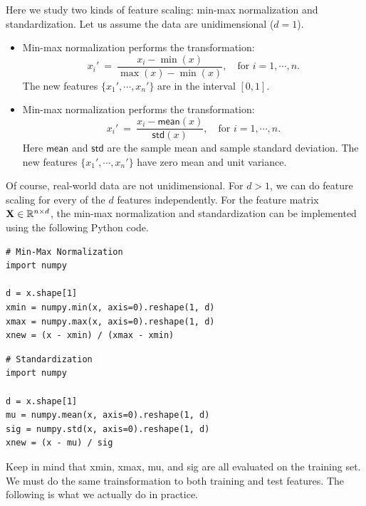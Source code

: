 \documentclass[11pt]{article}
\numberwithin{equation}{section}
\def\X{{\bf X}}
\def\RB{{\mathbb R}}
\def\mean{\mathsf{mean}}
\def\std{\mathsf{std}}
\begin{document}
Here we study two kinds of feature scaling: min-max normalization and standardization.
Let us assume the data are unidimensional ($d=1$).
\begin{itemize}
	\item 
	Min-max normalization performs the transformation:
	\begin{equation*}
	x_i' \: = \: \frac{ x_i - \min (x) }{ \max (x) - \min (x) },
	\quad \textrm{for } i = 1 , \cdots , n.
	\end{equation*}
	The new features $\{ x_1', \cdots , x_n' \}$ are in the interval $[0, 1]$.
	\item 
	Min-max normalization performs the transformation:
	\begin{equation*}
	x_i' \: = \: \frac{ x_i - \mean (x) }{ \std (x) },
	\quad \textrm{for } i = 1 , \cdots , n.
	\end{equation*}
	Here $\mean $ and $\std $ are the sample mean and sample standard deviation.
	The new features $\{ x_1', \cdots , x_n' \}$ have zero mean and unit variance.
\end{itemize}
Of course, real-world data are not unidimensional.
For $d > 1$, we can do feature scaling for every of the $d$ features independently.
For the feature matrix $\X \in \RB^{n\times d}$, the min-max normalization and standardization can be implemented using the following Python code.

\vspace{3mm}
\begin{lstlisting}
# Min-Max Normalization
import numpy

d = x.shape[1]
xmin = numpy.min(x, axis=0).reshape(1, d)
xmax = numpy.max(x, axis=0).reshape(1, d)
xnew = (x - xmin) / (xmax - xmin)
\end{lstlisting}
\vspace{3mm}

\vspace{3mm}
\begin{lstlisting}
# Standardization
import numpy

d = x.shape[1]
mu = numpy.mean(x, axis=0).reshape(1, d)
sig = numpy.std(x, axis=0).reshape(1, d)
xnew = (x - mu) / sig
\end{lstlisting}
\vspace{3mm}


Keep in mind that \textsf{xmin}, \textsf{xmax}, \textsf{mu}, and \textsf{sig} are all evaluated on the training set.
We must do the same trainsformation to both training and test features.
The following is what we actually do in practice.
\end{document}
